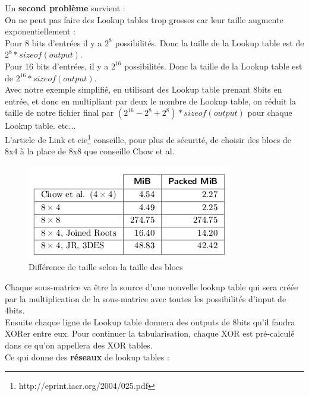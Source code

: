 \documentclass[a4paper,12pt]{article}
\begin{document}
Un \textbf{second problème} survient :\\

On ne peut pas faire des Lookup tables trop grosses car leur taille augmente exponentiellement :\\

Pour 8 bits d'entrées il y a $2^{8}$ possibilités. Donc la taille de la Lookup table est de $2^{8} * sizeof(output)$.\\
Pour 16 bits d'entrées, il y a $2^{16}$ possibilités. Donc la taille de la Lookup table est de $2^{16} * sizeof(output)$.\\
Avec notre exemple simplifié, en utilisant des Lookup table prenant 8bits en entrée, et donc en multipliant par deux le nombre de Lookup table, on réduit la taille de notre fichier final par $(2^{16} - 2^8 + 2^8) * sizeof(output)$ pour chaque Lookup table.
etc...\\

L'article de Link et cie\footnote{http://eprint.iacr.org/2004/025.pdf} conseille, pour plus de sécurité, de choisir des blocs de 8x4 à la place de 8x8 que conseille Chow et al.\\



\begin{figure}[h]
\centering
\includegraphics[scale=0.80]{./images/linketal.PNG}
\caption{Différence de taille selon la taille des blocs}
\label{fig:sizedif}
\end{figure}




Chaque sous-matrice va être la source d'une nouvelle lookup table qui sera créée par la multiplication de la sous-matrice avec toutes les possibilités d'input de 4bits.\\

Ensuite chaque ligne de Lookup table donnera des outputs de 8bits qu'il faudra XORer entre eux. Pour continuer la tabularisation, chaque XOR est pré-calculé dans ce qu'on appellera des XOR tables.\\

Ce qui donne des \textbf{réseaux} de lookup tables :\\
\end{document}
